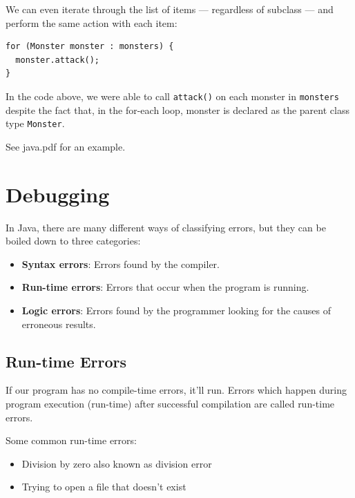 \documentclass[a4paper, 12pt]{article}
\begin{document}
We can even iterate through the list of items — regardless of subclass — and perform the same action with each item:
\begin{verbatim}
for (Monster monster : monsters) {
  monster.attack();
}
\end{verbatim}
In the code above, we were able to call \verb|attack()| on each monster in \verb|monsters| despite the fact that, in the for-each loop, monster is declared as the parent class type \verb|Monster|.

See java.pdf for an example.


\section{Debugging}
In Java, there are many different ways of classifying errors, but they can be boiled down to three categories:
\begin{itemize}
\item \textbf{Syntax errors}: Errors found by the compiler.

\item \textbf{Run-time errors}: Errors that occur when the program is running.

\item \textbf{Logic errors}: Errors found by the programmer looking for the causes of erroneous results.

\end{itemize}

\subsection{Run-time Errors}
If our program has no compile-time errors, it'll run. Errors which happen during program execution (run-time) after successful compilation are called run-time errors.

Some common run-time errors:
\begin{itemize}
\item Division by zero also known as division error

\item Trying to open a file that doesn't exist

\end{itemize}
\end{document}
